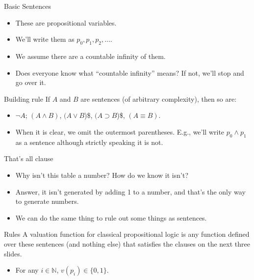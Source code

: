 \documentclass[
  17pt,
  letterpaper,
  ignorenonframetext,
  aspectratio=169,
]{beamer}
\providecommand{\tightlist}{%
  \setlength{\itemsep}{0pt}\setlength{\parskip}{0pt}}\usepackage{longtable,booktabs,array}
\begin{document}
\begin{frame}{Basic Sentences}
\protect\hypertarget{basic-sentences}{}
\begin{itemize}[<+->]
\tightlist
\item
  These are propositional variables.
\item
  We'll write them as \(p_0, p_1, p_2, \dots\).
\item
  We assume there are a countable infinity of them.
\item
  Does everyone know what ``countable infinity'' means? If not, we'll
  stop and go over it.
\end{itemize}
\end{frame}

\begin{frame}{Building rule}
\protect\hypertarget{building-rule}{}
If \(A\) and \(B\) are sentences (of arbitrary complexity), then so are:

\begin{itemize}[<+->]
\tightlist
\item
  \(\neg A\); \((A \wedge B)\), \((A \vee B\))\$, \((A \supset B\))\$,
  \((A \equiv B)\).
\item
  When it is clear, we omit the outermost parentheses. E.g., we'll write
  \(p_0 \wedge p_1\) as a sentence although strictly speaking it is not.
\end{itemize}
\end{frame}

\begin{frame}{That's all clause}
\protect\hypertarget{thats-all-clause}{}
\begin{itemize}[<+->]
\tightlist
\item
  Why isn't this table a number? How do we know it isn't?
\item
  Answer, it isn't generated by adding 1 to a number, and that's the
  only way to generate numbers.
\item
  We can do the same thing to rule out some things as sentences.
\end{itemize}
\end{frame}

\begin{frame}{Rules}
\protect\hypertarget{rules}{}
A valuation function for classical propositional logic is any function
defined over these sentences (and nothing else) that satisfies the
clauses on the next three slides.

\begin{itemize}[<+->]
\tightlist
\item
  For any \(i \in \mathbb{N}\), \(v(p_i) \in \{0, 1\}\).
\end{itemize}
\end{frame}
\end{document}
